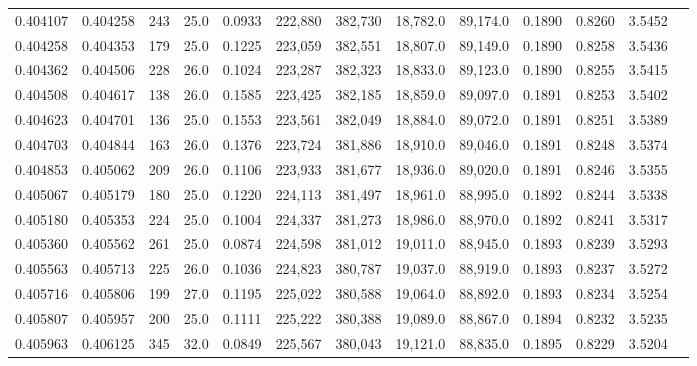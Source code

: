 \begin{tabular}{rrrrrrrrrrrrr}
0.404107 & 0.404258 &   243 & 25.0 &                                     0.0933 & 222,880 & 382,730 &  18,782.0 &  89,174.0 & 0.1890 & 0.8260 & 3.5452 \\
0.404258 & 0.404353 &   179 & 25.0 &                                     0.1225 & 223,059 & 382,551 &  18,807.0 &  89,149.0 & 0.1890 & 0.8258 & 3.5436 \\
0.404362 & 0.404506 &   228 & 26.0 &                                     0.1024 & 223,287 & 382,323 &  18,833.0 &  89,123.0 & 0.1890 & 0.8255 & 3.5415 \\
0.404508 & 0.404617 &   138 & 26.0 &                                     0.1585 & 223,425 & 382,185 &  18,859.0 &  89,097.0 & 0.1891 & 0.8253 & 3.5402 \\
0.404623 & 0.404701 &   136 & 25.0 &                                     0.1553 & 223,561 & 382,049 &  18,884.0 &  89,072.0 & 0.1891 & 0.8251 & 3.5389 \\
0.404703 & 0.404844 &   163 & 26.0 &                                     0.1376 & 223,724 & 381,886 &  18,910.0 &  89,046.0 & 0.1891 & 0.8248 & 3.5374 \\
0.404853 & 0.405062 &   209 & 26.0 &                                     0.1106 & 223,933 & 381,677 &  18,936.0 &  89,020.0 & 0.1891 & 0.8246 & 3.5355 \\
0.405067 & 0.405179 &   180 & 25.0 &                                     0.1220 & 224,113 & 381,497 &  18,961.0 &  88,995.0 & 0.1892 & 0.8244 & 3.5338 \\
0.405180 & 0.405353 &   224 & 25.0 &                                     0.1004 & 224,337 & 381,273 &  18,986.0 &  88,970.0 & 0.1892 & 0.8241 & 3.5317 \\
0.405360 & 0.405562 &   261 & 25.0 &                                     0.0874 & 224,598 & 381,012 &  19,011.0 &  88,945.0 & 0.1893 & 0.8239 & 3.5293 \\
0.405563 & 0.405713 &   225 & 26.0 &                                     0.1036 & 224,823 & 380,787 &  19,037.0 &  88,919.0 & 0.1893 & 0.8237 & 3.5272 \\
0.405716 & 0.405806 &   199 & 27.0 &                                     0.1195 & 225,022 & 380,588 &  19,064.0 &  88,892.0 & 0.1893 & 0.8234 & 3.5254 \\
0.405807 & 0.405957 &   200 & 25.0 &                                     0.1111 & 225,222 & 380,388 &  19,089.0 &  88,867.0 & 0.1894 & 0.8232 & 3.5235 \\
0.405963 & 0.406125 &   345 & 32.0 &                                     0.0849 & 225,567 & 380,043 &  19,121.0 &  88,835.0 & 0.1895 & 0.8229 & 3.5204 \\

\end{tabular}
